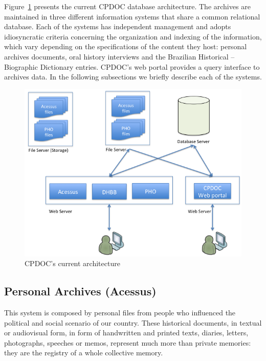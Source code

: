 Figure~\ref{fig:cpdoc-today} presents the current CPDOC database
architecture. The archives are maintained in three different
information systems that share a common relational database. 
Each of the systems has independent management and
adopts idiosyncratic criteria concerning the organization and indexing
of the information, which vary depending on the specifications of the
content they host: personal archives documents, oral history
interviews and the Brazilian Historical -- Biographic Dictionary
entries. CPDOC's web portal provides a query interface to archives data. In
the following subsections we briefly describe each of the systems.

\begin{figure}[thbp]
  \centering
  \includegraphics[width=.7\textwidth]{cur-architecture.png}
  \caption{CPDOC's current architecture}\label{fig:cpdoc-today}
\end{figure}

\subsection{Personal Archives (Acessus)}

This system is composed by personal
files from people who influenced the political and social scenario of
our country. These historical documents, in textual or audiovisual form, 
in form of handwritten and printed texts, diaries, letters,
photographs, speeches or memos, represent much more than private
memories: they are the registry of a whole collective memory.

